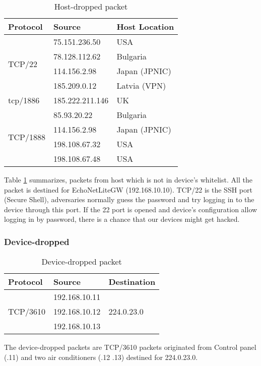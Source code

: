 \begin{table}[h]
    \caption{Host-dropped packet }
    \label{table:s4_host_drop}
    \centering
    \begin{tabular*}{\textwidth}{ @{\extracolsep{\fill}} lll}
        \toprule
        \textbf{Protocol}             & \textbf{Source}          & \textbf{Host Location} \\  \toprule 
        \multirow{4}{*}{TCP/22}     & 75.151.236.50     & USA           \\ 
                                    & 78.128.112.62     & Bulgaria      \\
                                    & 114.156.2.98      & Japan (JPNIC) \\
                                    & 185.209.0.12      & Latvia (VPN)  \\ \cline{1-3}
        tcp/1886                    & 185.222.211.146   & UK            \\ \cline{1-3}
        \multirow{4}{*}{TCP/1888}   & 85.93.20.22       & Bulgaria      \\
                                    & 114.156.2.98      & Japan (JPNIC) \\
                                    & 198.108.67.32     & USA           \\
                                    & 198.108.67.48     & USA           \\ \bottomrule
    \end{tabular*} 
\end{table}

Table \ref{table:s4_host_drop} summarizes, packets from host which is not in device's whitelist. 
All the packet is destined for EchoNetLiteGW (192.168.10.10). 
TCP/22 is the SSH port (Secure Shell), adversaries normally guess the password and try logging in to the device through this port. If the 22 port is opened and device’s configuration allow logging in by password, there is a chance that our devices might get hacked.

\subsubsection{Device-dropped}
\begin{table}[h]
    \caption{Device-dropped packet }
    \label{table:s4_device_drop}
    \centering
    \begin{tabular*}{0.6\textwidth}{ @{\extracolsep{\fill}} lll}
        \toprule
        \textbf{Protocol}           & \textbf{Source}   & \textbf{Destination} \\  \toprule 
        \multirow{3}{*}{TCP/3610}   & 192.168.10.11     &  \multirow{3}{*}{224.0.23.0} \\           
                                    & 192.168.10.12     &  \\
                                    & 192.168.10.13     &  \\
        \bottomrule
    \end{tabular*} 
\end{table}
The device-dropped packets are TCP/3610 packets originated from Control panel (.11) and two air conditioners (.12 .13) destined for 224.0.23.0.  

